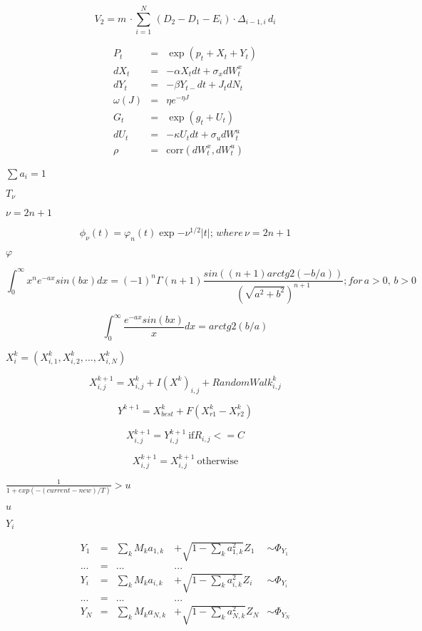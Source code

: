 \documentclass{article}
\begin{document}
\[V_2 =m \, \cdot \sum_{i=1}^N \,(D_2 - D_1 - E_i) \cdot \Delta_{i-1,i}\,d_i
\]
\pagebreak

\[\begin{array}{rcl}
    P_t &=& \exp(p_t + X_t + Y_t) \\
    dX_t &=& -\alpha X_tdt + \sigma_x dW_t^x \\
    dY_t &=& -\beta Y_{t-}dt + J_tdN_t \\
    \omega(J) &=& \eta e^{-\eta J} \\
    G_t &=& \exp(g_t + U_t) \\
    dU_t &=& -\kappa U_tdt + \sigma_udW_t^u \\
    \rho &=& \mathrm{corr} (dW_t^x, dW_t^u)
 \end{array}
\]
\pagebreak

$ \sum a_i=1$
\pagebreak

$T_\nu$
\pagebreak

$\nu=2n+1$
\pagebreak

\[\phi_{\nu}(t) = \varphi_{n}(t) \exp{-\nu^{1/2}|t|} ;\,where\,\nu = 2n+1
\]
\pagebreak

$ \varphi $
\pagebreak

\[ \int_0^{\infty}x^n e^{-ax}sin(bx)dx =
        (-1)^n \Gamma(n+1) \frac{sin((n+1)arctg2(-b/a))}
            {(\sqrt{a^2+b^2})^{n+1}}; for\,a>0,\,b>0
\]
\pagebreak

\[    \int_0^{\infty} \frac{e^{-ax}sin(bx)}{x} dx = arctg2(b/a)
\]
\pagebreak

$ X_{i}^k = (X_{i, 1}^k, X_{i, 2}^k, \ldots, X_{i, N}^k) $
\pagebreak

\[X_{i, j}^{k+1} = X_{i, j}^k + I(X^k)_{i,j} + RandomWalk_{i,j}^k
\]
\pagebreak

\[Y^{k+1} = X_{best}^k + F(X_{r1}^k - X_{r2}^k)
\]
\pagebreak

\[X_{i,j}^{k+1} = Y_{i,j}^{k+1}\ \text{if} R_{i,j} <= C
\]
\pagebreak

\[X_{i,j}^{k+1} = X_{i,j}^{k+1}\ \text{otherwise}
\]
\pagebreak

$ \frac{1}{1+exp(-(current-new)/T)} > u $
\pagebreak

$ u $
\pagebreak

$ Y_i $
\pagebreak

\[    \begin{array}{ccccc}
    Y_1 & = & \sum_k M_k a_{1,k} & + \sqrt{1-\sum_k a_{1,k}^2} Z_1 & 
        \sim \Phi_{Y_1}\nonumber \\
    ... & = &      ... & ...   & \nonumber \\
    Y_i & = & \sum_k M_k a_{i,k} & + \sqrt{1-\sum_k a_{i,k}^2} Z_i & 
        \sim \Phi_{Y_i}\nonumber \\
    ... & = &      ... & ...   & \nonumber \\
    Y_N & = & \sum_k M_k a_{N,k} & + \sqrt{1-\sum_k a_{N,k}^2} Z_N & 
        \sim \Phi_{Y_N}
    \end{array}
\]
\pagebreak
\end{document}
